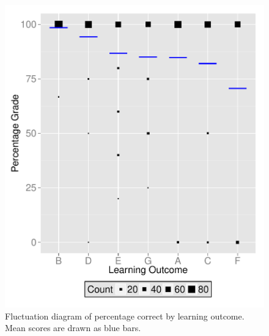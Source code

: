 \documentclass[12pt,english,nohyper]{tufte-handout}\usepackage[]{graphicx}\usepackage[]{color}
\begin{document}
\vspace{5mm}

\begin{figure}[!ht]
\includegraphics[width=\linewidth]{Topic04_AB_LearningObj_boxplot.pdf}
\caption{Fluctuation diagram of percentage correct by learning outcome. Mean scores are drawn as blue bars.}
\label{fig:LearningObj_summary}
\end{figure}
\end{document}
